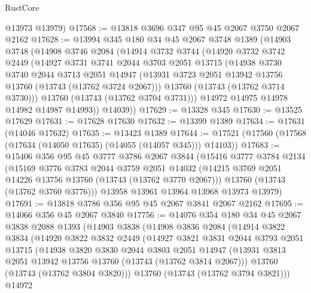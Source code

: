 \begin{lexlean}{RustCore}
\begin{coremodule}
      @13973
      @13979)
@17568 := @13818 @3696 @347 @95 @45 @2067 @3750 @2067 @2162
@17628 := @13994
    @345
    @180
    @34
    @45
    @2067
    @3748
    @1389
    (@14903
      @3748
      (@14908
        @3746
        @2084
        (@14914
          @3732
          @3744
          (@14920
            @3732
            @3742
            @2449
            (@14927
              @3731
              @3741
              @2044
              @3703
              @2051
              @13715
              (@14938
                @3730
                @3740
                @2044
                @3713
                @2051
                @14947
                (@13931 @3723 @2051 @13942 @13756 @13760 (@13743 (@13762 @3724 @2067)))
                @13760
                (@13743 (@13762 @3714 @3730)))
              @13760
              (@13743 (@13762 @3704 @3731)))
            @14972
            @14975
            @14978
            @14982
            @14987
            @14993))
        @14039))
@17629 := @13328 @345
@17630 := @13525 @17629
@17631 := @17628 @17630
@17632 := @13399 @1389
@17634 := @17631 (@14046 @17632)
@17635 := @13423 @1389
@17644 := @17521 (@17560 (@17568 (@17634 (@14050 @17635) (@14055 (@14057 @345))) @14103))
@17683 := @15406
    @356
    @95
    @45
    @3777
    @3786
    @2067
    @3844
    (@15416
      @3777
      @3784
      @2134
      (@15169
        @3776
        @3783
        @2044
        @3759
        @2051
        @14032
        (@14215 @3769 @2051 @14226 @13756 @13760 (@13743 (@13762 @3770 @2067)))
        @13760
        (@13743 (@13762 @3760 @3776)))
      @13958
      @13961
      @13964
      @13968
      @13973
      @13979)
@17691 := @13818 @3786 @356 @95 @45 @2067 @3841 @2067 @2162
@17695 := @14066 @356 @45 @2067 @3840
@17756 := @14076
    @354
    @180
    @34
    @45
    @2067
    @3838
    @2088
    @1393
    (@14903
      @3838
      (@14908
        @3836
        @2084
        (@14914
          @3822
          @3834
          (@14920
            @3822
            @3832
            @2449
            (@14927
              @3821
              @3831
              @2044
              @3793
              @2051
              @13715
              (@14938
                @3820
                @3830
                @2044
                @3803
                @2051
                @14947
                (@13931 @3813 @2051 @13942 @13756 @13760 (@13743 (@13762 @3814 @2067)))
                @13760
                (@13743 (@13762 @3804 @3820)))
              @13760
              (@13743 (@13762 @3794 @3821)))
            @14972

\end{coremodule}
\end{lexlean}
